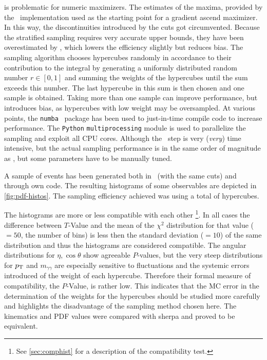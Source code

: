 is problematic for numeric maximizers.  The estimates of the maxima,
provided by the \vegas\ implementation used as the starting point for
a gradient ascend maximizer. In this way, the discontinuities
introduced by the cuts got circumvented. Because the stratified
sampling requires very accurate upper bounds, they have been
overestimated by \!, which lowers
the efficiency slightly but reduces bias. The sampling algorithm
chooses hypercubes randomly in accordance to their contribution to the
integral by generating a uniformly distributed random number
\(r\in [0,1]\) and summing the weights of the hypercubes until the sum
exceeds this number. The last hypercube in this sum is then chosen and
one sample is obtained. Taking more than one sample can improve
performance, but introduces bias, as hypercubes with low weight may be
oversampled. At various points, the \texttt{numba}~\cite{lam2015:po}
package has been used to just-in-time compile code to increase
performance. The \texttt{Python} \texttt{multiprocessing} module is
used to parallelize the sampling and exploit all CPU cores. Although
the \vegas\ step is very (\emph{very}) time intensive, but the actual
sampling performance is in the same order of magnitude as \sherpa, but
some parameters have to be manually tuned.

A sample of  events has been
generated both in \sherpa\ (with the same cuts) and through own
code. The resulting histograms of some observables are depicted in
\cref{fig:pdf-histos}. The sampling efficiency achieved was
 using a total of
 hypercubes.

The histograms are more or less compatible with each other
\footnote{See \cref{sec:comphist} for a description of the
  compatibility test.}. In all cases the difference between
\(T\)-Value and the mean of the \(\chi^2\) distribution for that value
(\(=50\), the number of bins) is less then the standard deviation
(\(=10\)) of the same distribution and thus the histograms are
considered compatible. The angular distributions for
\(\eta, \cos\theta\) show agreeable \(P\)-values, but the very steep
distributions for \(p_\mathrm{T}\) and \(m_{\gamma\gamma}\) are especially
sensitive to fluctuations and the systemic errors introduced of the
weight of each hypercube. Therefore their formal measure of
compatibility, the \(P\)-Value, is rather low. This indicates that the
MC error in the determination of the weights for the hypercubes should
be studied more carefully and highlights the disadvantage of the
sampling method chosen here. The kinematics and PDF values were
compared with sherpa and proved to be equivalent.

